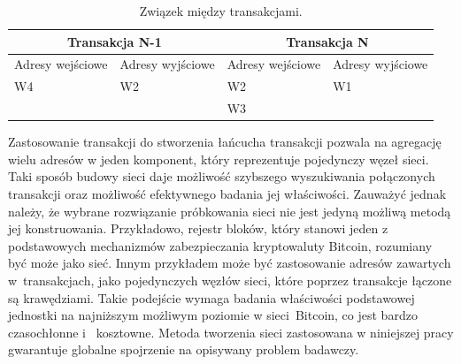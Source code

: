 \documentclass[12pt, twoside, final, openany]{mgr}
\begin{document}
\begin{table}[H]
\begin{center}
\caption{Związek między transakcjami.}
\label{tab:zwiazekTransakcji}
\begin{tabular}{|l|l|l|l|}
\hline
	\multicolumn{2}{|c|}{Transakcja N-1} 
   &\multicolumn{2}{|c|}{Transakcja N}  \\
\hline
Adresy wejściowe & Adresy wyjściowe &Adresy wejściowe & Adresy wyjściowe\\
\hline
W4 & W2 & W2 & W1 \\
&& W3 & \\
\hline 
\end{tabular}
\end{center}
\end{table}

\indent Zastosowanie transakcji do stworzenia łańcucha transakcji pozwala na agregację wielu adresów w jeden komponent, który reprezentuje pojedynczy węzeł sieci. Taki sposób budowy sieci  daje możliwość szybszego wyszukiwania połączonych transakcji oraz możliwość efektywnego badania jej właściwości. Zauważyć jednak należy, że wybrane rozwiązanie próbkowania sieci nie jest jedyną możliwą metodą jej konstruowania. Przykładowo, rejestr bloków, który stanowi jeden z podstawowych mechanizmów zabezpieczania kryptowaluty Bitcoin, rozumiany być może jako sieć. Innym przykładem może być zastosowanie adresów zawartych w~transakcjach, jako pojedynczych węzłów sieci, które poprzez transakcje łączone są krawędziami. Takie podejście wymaga badania właściwości podstawowej jednostki na najniższym możliwym poziomie w sieci~Bitcoin, co jest bardzo czasochłonne i~ kosztowne. Metoda tworzenia sieci zastosowana w niniejszej pracy gwarantuje globalne spojrzenie na opisywany problem badawczy. 
\end{document}
